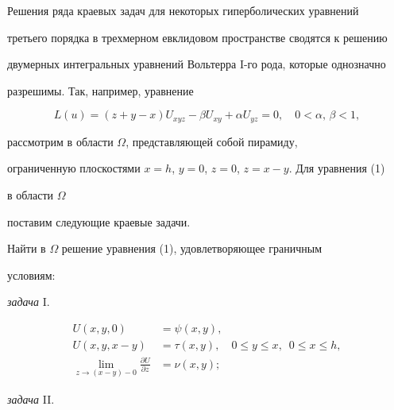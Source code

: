 \maketitle 


\label{begin} 


 


Решения ряда краевых задач для некоторых гиперболических уравнений 


третьего порядка в трехмерном евклидовом пространстве сводятся к решению  


двумерных интегральных уравнений Вольтерра I-го рода, которые однозначно 


разрешимы. Так, например, уравнение 


\begin{equation} 


L(u)=(z+y-x)U_{xyz}-\beta U_{xy}+\alpha U_{yz}=0,\quad 


0<\alpha,\,\beta<1, 


\end{equation} 


рассмотрим в области $\Omega$, представляющей собой пирамиду, 


ограниченную плоскостями $x=h$, $y=0$, $z=0$, $z=x-y$. Для уравнения (1) 


в области $\Omega$ 


поставим следующие краевые задачи. 


\medskip 


 


Найти в $\Omega$ решение уравнения (1), удовлетворяющее граничным 


условиям: 


 


{\it задача} I. 


\begin{align} 


U(x,y,0)&=\psi(x,y), \\ 


U(x,y,x-y)&=\tau(x,y),\quad 0\le y\le x, \ \;0\le x\le h, \\ 


\lim_{z\to(x-y)-0}\frac{\partial U}{\partial z}&=\nu(x,y); 


\end{align} 


 


{\it задача} II. 


